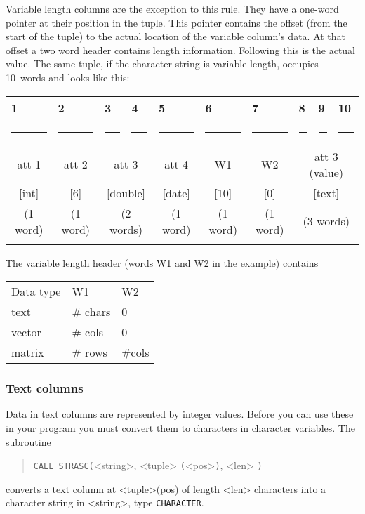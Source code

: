 \documentclass[11pt,a4paper]{report}
\begin{document}
\medskip
Variable length columns are the exception to this rule.
They have a one-word pointer at their position in the tuple.
This pointer contains the offset (from the start of the tuple)
to the actual location of the variable column's data.
At that offset a two word header contains length information.
Following this is the actual value.
The same tuple, if the character string is variable length,
occupies 10~words and
looks like this:
 
\smallskip
{\centering\small{}
 \def\strut{\rule{0pt}{2pt}} \def\Strut{\rule{0pt}{12pt}}
 \def\fl{\multicolumn{1}{|l|}}
\begin{tabular}{|c|c|c|c|c|c|c|c|c|c|}
 \fl{1}&\fl{2}&\fl{3}&\fl{4}&\fl{5}&\fl{6}&\fl{7}&\fl{8}&\fl{9}&\fl{10}\\
 \hline
   \rule{25pt}{0pt}&
   \rule{25pt}{0pt}&
   \rule{25pt}{0pt}&
   \rule{25pt}{0pt}&
   \rule{25pt}{0pt}&
   \rule{25pt}{0pt}&
   \rule{25pt}{0pt}&
   \rule{25pt}{0pt}&
   \rule{25pt}{0pt}&
   \rule{25pt}{0pt}\\
 \Strut att 1&
 att 2&
 \multicolumn{2}{|c|}{att 3}&
 att 4&
  W1 &
  W2 &
  \multicolumn{3}{|c|}{att 3 (value)}\\
 \Strut [int]&
 [6]&
 \multicolumn{2}{|c|}{[double]}&
 [date]&
   [10]&
   [0]&
   \multicolumn{3}{|c|}{[text]}\\
 \Strut (1 word)&
 (1 word)&
 \multicolumn{2}{|c|}{(2 words)}&
 (1 word)&
  (1 word)&
  (1 word)&
  \multicolumn{3}{|c|}{(3 words)}\\
  &&&&&&&&&\\
 \hline
\end{tabular}
\par}
 
\medskip
The variable length header (words W1 and W2 in the example) contains
 
{\centering
\begin{tabular}{lll}
Data type& W1& W2\\
\noalign{\medskip}
text& \# chars& 0\\
vector&\# cols& 0\\
matrix& \# rows& \#cols
\end{tabular}}
 
 
\medskip
 
\subsubsection{Text columns}
%
Data in text columns are represented by integer values.
Before you can use these in your program you must convert them
to characters in character variables.
The subroutine
\begin{verse}
  \verb!CALL STRASC(!<string>, <tuple> \verb!(!<pos>\verb!)!, <len> \verb!)!
\end{verse}
converts a text column at <tuple>(pos) of length <len> characters
into a character string in <string>, type \verb!CHARACTER!.
 
\end{document}
